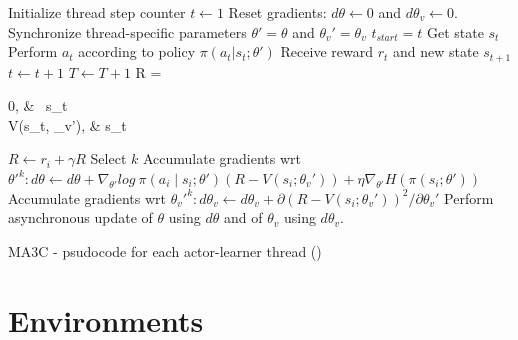 \begin{algorithm}[hbtp]
\begin{algorithmic}
    \State {}
    \State {}
    \State {}
    \State Initialize thread step counter $t \leftarrow 1$
    \Repeat
        \State Reset gradients: $d\theta \leftarrow 0$ and $d\theta_v \leftarrow 0$.
        \State Synchronize thread-specific parameters $\theta' = \theta$ and $\theta_v' = \theta_v$
        \State $t_{start} = t$
        \State Get state $s_t$
        \Repeat
            \State Perform $a_t$ according to policy $\pi(a_t|s_t;\theta')$
            \State Receive reward $r_t$ and new state $s_{t+1}$
            \State $t \leftarrow t + 1$
            \State $T \leftarrow T + 1$
        \State R = \begin{cases}
                0,   & \ s_t \\
                V(s_t, \theta_v'),   &  s_t \;\\
            \end{cases}
            \State $R \leftarrow r_i + \gamma R$
            \State Select $k$ \;
            \State Accumulate gradients wrt $\theta'^k: d\theta \leftarrow d\theta + \nabla_{\theta'} log\:\pi(a_i\mid s_i;\theta')(R-V(s_i;\theta_v'))+\eta\nabla_{\theta'}H(\pi(s_i;\theta'))$
            \State Accumulate gradients wrt $\theta_v'^k: d\theta_v \leftarrow d\theta_v + \partial(R-V(s_i;\theta_v'))^2 / \partial \theta_{v}'$
        \EndFor
        \State Perform asynchronous update of $\theta$ using $d\theta$ and of $\theta_v$ using $d\theta_v$.
\end{algorithmic}
\caption{\acl{MA3C} - psudocode for each actor-learner thread (\cite{mnih2016A3C})}
\label{alg:MA3C}
\end{algorithm}

\section{Environments}

